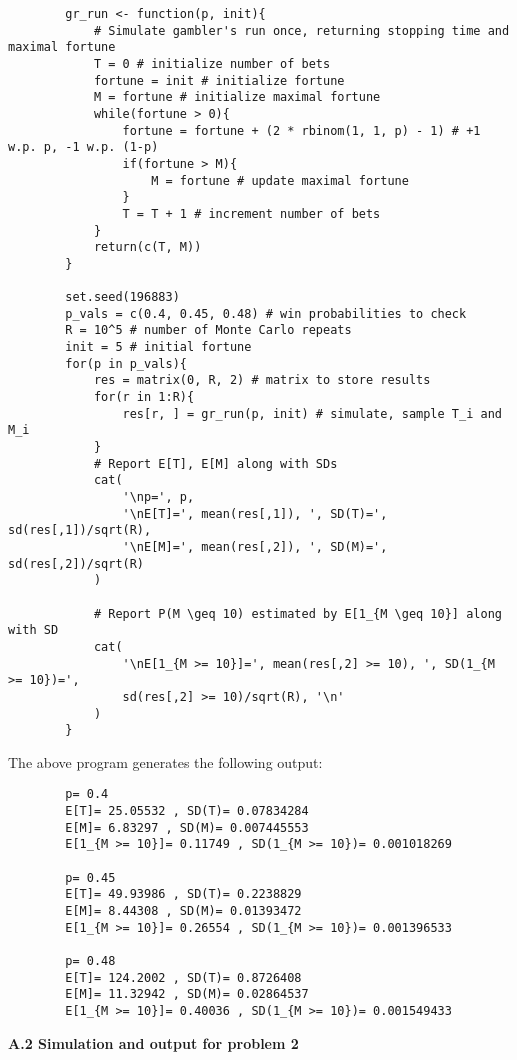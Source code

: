 \documentclass[11pt, letterpaper]{article}
\begin{document}
    \begin{verbatim}
        gr_run <- function(p, init){
            # Simulate gambler's run once, returning stopping time and maximal fortune
            T = 0 # initialize number of bets
            fortune = init # initialize fortune
            M = fortune # initialize maximal fortune
            while(fortune > 0){
                fortune = fortune + (2 * rbinom(1, 1, p) - 1) # +1 w.p. p, -1 w.p. (1-p)
                if(fortune > M){
                    M = fortune # update maximal fortune 
                }
                T = T + 1 # increment number of bets
            }
            return(c(T, M))
        }

        set.seed(196883)
        p_vals = c(0.4, 0.45, 0.48) # win probabilities to check
        R = 10^5 # number of Monte Carlo repeats
        init = 5 # initial fortune
        for(p in p_vals){
            res = matrix(0, R, 2) # matrix to store results
            for(r in 1:R){
                res[r, ] = gr_run(p, init) # simulate, sample T_i and M_i
            }
            # Report E[T], E[M] along with SDs
            cat(
                '\np=', p,
                '\nE[T]=', mean(res[,1]), ', SD(T)=', sd(res[,1])/sqrt(R),
                '\nE[M]=', mean(res[,2]), ', SD(M)=', sd(res[,2])/sqrt(R)
            )

            # Report P(M \geq 10) estimated by E[1_{M \geq 10}] along with SD
            cat(
                '\nE[1_{M >= 10}]=', mean(res[,2] >= 10), ', SD(1_{M >= 10})=',
                sd(res[,2] >= 10)/sqrt(R), '\n'
            )
        }
    \end{verbatim}
    The above program generates the following output:
    \begin{verbatim}
        p= 0.4 
        E[T]= 25.05532 , SD(T)= 0.07834284 
        E[M]= 6.83297 , SD(M)= 0.007445553
        E[1_{M >= 10}]= 0.11749 , SD(1_{M >= 10})= 0.001018269 

        p= 0.45 
        E[T]= 49.93986 , SD(T)= 0.2238829 
        E[M]= 8.44308 , SD(M)= 0.01393472
        E[1_{M >= 10}]= 0.26554 , SD(1_{M >= 10})= 0.001396533 

        p= 0.48 
        E[T]= 124.2002 , SD(T)= 0.8726408 
        E[M]= 11.32942 , SD(M)= 0.02864537
        E[1_{M >= 10}]= 0.40036 , SD(1_{M >= 10})= 0.001549433 
    \end{verbatim}
    {\bf A.2 Simulation and output for problem 2}
\end{document}
